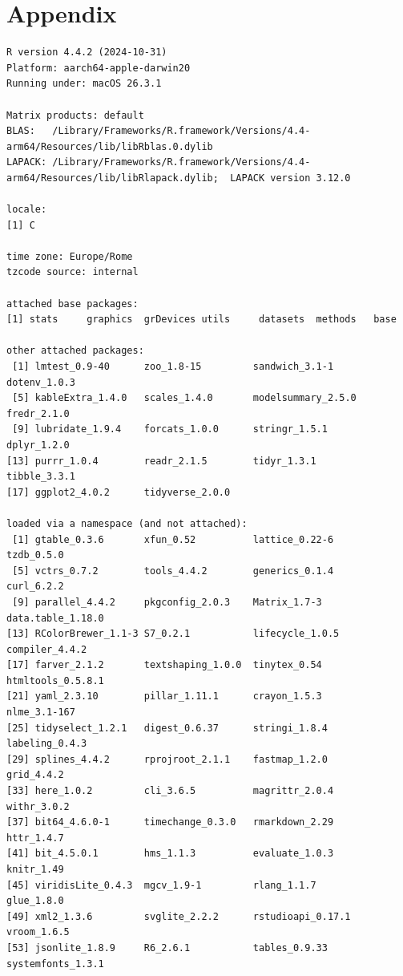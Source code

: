 \documentclass[
  12pt,
]{article}
\begin{document}
\hypertarget{appendix}{%
\section{Appendix}\label{appendix}}

\begin{verbatim}
R version 4.4.2 (2024-10-31)
Platform: aarch64-apple-darwin20
Running under: macOS 26.3.1

Matrix products: default
BLAS:   /Library/Frameworks/R.framework/Versions/4.4-arm64/Resources/lib/libRblas.0.dylib 
LAPACK: /Library/Frameworks/R.framework/Versions/4.4-arm64/Resources/lib/libRlapack.dylib;  LAPACK version 3.12.0

locale:
[1] C

time zone: Europe/Rome
tzcode source: internal

attached base packages:
[1] stats     graphics  grDevices utils     datasets  methods   base     

other attached packages:
 [1] lmtest_0.9-40      zoo_1.8-15         sandwich_3.1-1     dotenv_1.0.3      
 [5] kableExtra_1.4.0   scales_1.4.0       modelsummary_2.5.0 fredr_2.1.0       
 [9] lubridate_1.9.4    forcats_1.0.0      stringr_1.5.1      dplyr_1.2.0       
[13] purrr_1.0.4        readr_2.1.5        tidyr_1.3.1        tibble_3.3.1      
[17] ggplot2_4.0.2      tidyverse_2.0.0   

loaded via a namespace (and not attached):
 [1] gtable_0.3.6       xfun_0.52          lattice_0.22-6     tzdb_0.5.0        
 [5] vctrs_0.7.2        tools_4.4.2        generics_0.1.4     curl_6.2.2        
 [9] parallel_4.4.2     pkgconfig_2.0.3    Matrix_1.7-3       data.table_1.18.0 
[13] RColorBrewer_1.1-3 S7_0.2.1           lifecycle_1.0.5    compiler_4.4.2    
[17] farver_2.1.2       textshaping_1.0.0  tinytex_0.54       htmltools_0.5.8.1 
[21] yaml_2.3.10        pillar_1.11.1      crayon_1.5.3       nlme_3.1-167      
[25] tidyselect_1.2.1   digest_0.6.37      stringi_1.8.4      labeling_0.4.3    
[29] splines_4.4.2      rprojroot_2.1.1    fastmap_1.2.0      grid_4.4.2        
[33] here_1.0.2         cli_3.6.5          magrittr_2.0.4     withr_3.0.2       
[37] bit64_4.6.0-1      timechange_0.3.0   rmarkdown_2.29     httr_1.4.7        
[41] bit_4.5.0.1        hms_1.1.3          evaluate_1.0.3     knitr_1.49        
[45] viridisLite_0.4.3  mgcv_1.9-1         rlang_1.1.7        glue_1.8.0        
[49] xml2_1.3.6         svglite_2.2.2      rstudioapi_0.17.1  vroom_1.6.5       
[53] jsonlite_1.8.9     R6_2.6.1           tables_0.9.33      systemfonts_1.3.1 
\end{verbatim}
\end{document}

